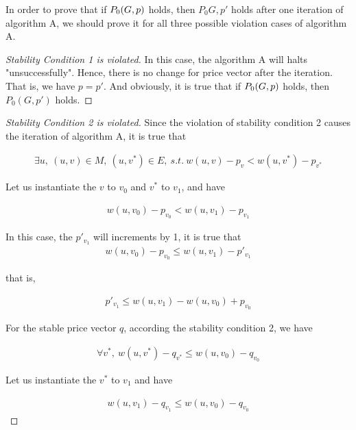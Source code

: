 \documentclass[11pt,a4paper]{article}
\begin{document}
In order to prove that if $P_0(G, p)$ holds, then $P_0{G, p'}$ holds after one
iteration of algorithm A, we should prove it for all three possible violation
cases of algorithm A.

\begin{proof}[Stability Condition 1 is violated]
    In this case, the algorithm A will halts "unsuccessfully". Hence, there is
    no change for price vector after the iteration. That is, we have $p = p'$.
    And obviously, it is true that if $P_0(G, p)$ holds, then $P_0(G, p')$ holds.
\end{proof}

\begin{proof}[Stability Condition 2 is violated]
    Since the violation of stability condition 2 causes the iteration of
    algorithm A, it is true that 
    
    \begin{align}
        \exists u,\ (u, v) \in M,\ (u, v^*) \in E,\ s.t.\ 
        w(u, v) - p_{v} < w(u, v^*) - p_{v^*}
    \end{align}
    
    Let us instantiate the $v$ to $v_0$ and $v^*$ to $v_1$, and have
    
    \begin{align}
        w(u, v_0) - p_{v_0} < w(u, v_1) - p_{v_1}
    \end{align}

    In this case, the $p'_{v_1}$ will increments by 1, it is true that
    \begin{align}
        w(u, v_0) - p_{v_0} \leq w(u, v_1) - p'_{v_1}
    \end{align}

    that is,

    \begin{align} \label{ex2:p_v_1leqbala}
         p'_{v_1} \leq w(u, v_1) - w(u, v_0) + p_{v_0}
    \end{align}

    For the stable price vector $q$, according the stability condition 2, we
    have 

    \begin{align}
        \forall v^{*},\ w(u, v^{*}) - q_{v^{*}} \leq w(u, v_0) - q_{v_0}    
    \end{align}

    Let us instantiate the $v^{*}$ to $v_1$ and have

    \begin{align}
        w(u, v_1) - q_{v_1} \leq w(u, v_0) - q_{v_0}
    \end{align}


\end{proof}
\end{document}
